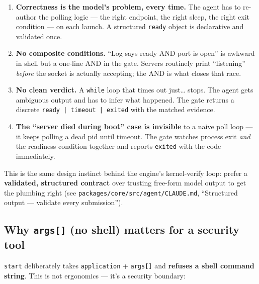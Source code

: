 \documentclass[11pt]{article}
\begin{document}
\begin{enumerate}[leftmargin=*]
  \item \textbf{Correctness is the model's problem, every time.} The agent has to
  re-author the polling logic --- the right endpoint, the right sleep, the right
  exit condition --- on each launch. A structured \texttt{ready} object is
  declarative and validated once.
  \item \textbf{No composite conditions.} ``Log says ready AND port is open'' is
  awkward in shell but a one-line AND in the gate. Servers routinely print
  ``listening'' \textit{before} the socket is actually accepting; the AND is what
  closes that race.
  \item \textbf{No clean verdict.} A \texttt{while} loop that times out just\ldots
  stops. The agent gets ambiguous output and has to infer what happened. The gate
  returns a discrete \texttt{ready | timeout | exited} with the matched evidence.
  \item \textbf{The ``server died during boot'' case is invisible} to a naive
  poll loop --- it keeps polling a dead pid until timeout. The gate watches
  process exit \textit{and} the readiness condition together and reports
  \texttt{exited} with the code immediately.
\end{enumerate}

This is the same design instinct behind the engine's kernel-verify loop: prefer a
\textbf{validated, structured contract} over trusting free-form model output to
get the plumbing right (see \texttt{packages/core/src/agent/CLAUDE.md},
``Structured output --- validate every submission'').

\subsection{Why \texttt{args[]} (no shell) matters for a security tool}

\texttt{start} deliberately takes \texttt{application} + \texttt{args[]} and
\textbf{refuses a shell command string}. This is not ergonomics --- it's a
security boundary:
\end{document}
